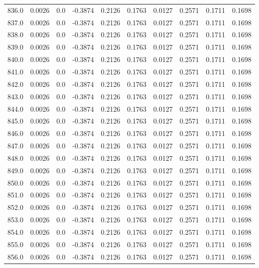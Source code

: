 \begin{longtable}{lrrrrrrrrr}
836.0 & 0.0026 & 0.0 & -0.3874 & 0.2126 & 0.1763 & 0.0127 & 0.2571 & 0.1711 & 0.1698 \\
837.0 & 0.0026 & 0.0 & -0.3874 & 0.2126 & 0.1763 & 0.0127 & 0.2571 & 0.1711 & 0.1698 \\
838.0 & 0.0026 & 0.0 & -0.3874 & 0.2126 & 0.1763 & 0.0127 & 0.2571 & 0.1711 & 0.1698 \\
839.0 & 0.0026 & 0.0 & -0.3874 & 0.2126 & 0.1763 & 0.0127 & 0.2571 & 0.1711 & 0.1698 \\
840.0 & 0.0026 & 0.0 & -0.3874 & 0.2126 & 0.1763 & 0.0127 & 0.2571 & 0.1711 & 0.1698 \\
841.0 & 0.0026 & 0.0 & -0.3874 & 0.2126 & 0.1763 & 0.0127 & 0.2571 & 0.1711 & 0.1698 \\
842.0 & 0.0026 & 0.0 & -0.3874 & 0.2126 & 0.1763 & 0.0127 & 0.2571 & 0.1711 & 0.1698 \\
843.0 & 0.0026 & 0.0 & -0.3874 & 0.2126 & 0.1763 & 0.0127 & 0.2571 & 0.1711 & 0.1698 \\
844.0 & 0.0026 & 0.0 & -0.3874 & 0.2126 & 0.1763 & 0.0127 & 0.2571 & 0.1711 & 0.1698 \\
845.0 & 0.0026 & 0.0 & -0.3874 & 0.2126 & 0.1763 & 0.0127 & 0.2571 & 0.1711 & 0.1698 \\
846.0 & 0.0026 & 0.0 & -0.3874 & 0.2126 & 0.1763 & 0.0127 & 0.2571 & 0.1711 & 0.1698 \\
847.0 & 0.0026 & 0.0 & -0.3874 & 0.2126 & 0.1763 & 0.0127 & 0.2571 & 0.1711 & 0.1698 \\
848.0 & 0.0026 & 0.0 & -0.3874 & 0.2126 & 0.1763 & 0.0127 & 0.2571 & 0.1711 & 0.1698 \\
849.0 & 0.0026 & 0.0 & -0.3874 & 0.2126 & 0.1763 & 0.0127 & 0.2571 & 0.1711 & 0.1698 \\
850.0 & 0.0026 & 0.0 & -0.3874 & 0.2126 & 0.1763 & 0.0127 & 0.2571 & 0.1711 & 0.1698 \\
851.0 & 0.0026 & 0.0 & -0.3874 & 0.2126 & 0.1763 & 0.0127 & 0.2571 & 0.1711 & 0.1698 \\
852.0 & 0.0026 & 0.0 & -0.3874 & 0.2126 & 0.1763 & 0.0127 & 0.2571 & 0.1711 & 0.1698 \\
853.0 & 0.0026 & 0.0 & -0.3874 & 0.2126 & 0.1763 & 0.0127 & 0.2571 & 0.1711 & 0.1698 \\
854.0 & 0.0026 & 0.0 & -0.3874 & 0.2126 & 0.1763 & 0.0127 & 0.2571 & 0.1711 & 0.1698 \\
855.0 & 0.0026 & 0.0 & -0.3874 & 0.2126 & 0.1763 & 0.0127 & 0.2571 & 0.1711 & 0.1698 \\
856.0 & 0.0026 & 0.0 & -0.3874 & 0.2126 & 0.1763 & 0.0127 & 0.2571 & 0.1711 & 0.1698 \\

\end{longtable}

